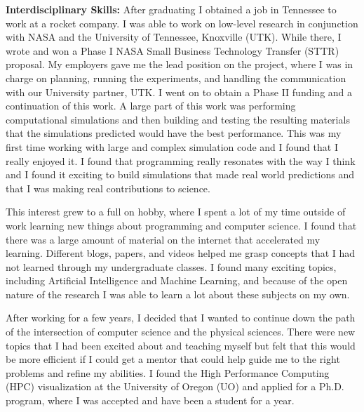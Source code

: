 \documentclass[12pt]{article}
\begin{document}
\textbf{Interdisciplinary Skills: }After graduating I obtained a job in
Tennessee to work at a rocket company.  I was able to work on low-level research
in conjunction with NASA and the University of Tennessee, Knoxville (UTK). While
there, I wrote and won a Phase I NASA Small Business Technology Transfer (STTR)
proposal. My employers gave me the lead position on the project, where I was in
charge on planning, running the experiments, and handling the communication with
our University partner, UTK. I went on to obtain a Phase II funding and a
continuation of this work. A large part of this work was performing
computational simulations and then building and testing the resulting materials
that the simulations predicted would have the best performance. This was my
first time working with large and complex simulation code and I found that I
really enjoyed it. I found that programming really resonates with the way I
think and I found it exciting to build simulations that made real world
predictions and that I was making real contributions to science. 

This interest grew to a full on hobby, where I spent a lot of my time outside of
work learning new things about programming and computer science. I found that
there was a large amount of material on the internet that accelerated my
learning. Different blogs, papers, and videos helped me grasp concepts that I
had not learned through my undergraduate classes. I found many exciting topics,
including Artificial Intelligence and Machine Learning, and because of the open
nature of the research I was able to learn a lot about these subjects on my own.

After working for a few years, I decided that I wanted to continue down the path
of the intersection of computer science and the physical sciences. There were
new topics that I had been excited about and teaching myself but felt that this
would be more efficient if I could get a mentor that could help guide me to the
right problems and refine my abilities. I found the High Performance Computing
(HPC) visualization at the University of Oregon (UO) and applied for a Ph.D.
program, where I was accepted and have been a student for a year. 
\end{document}
